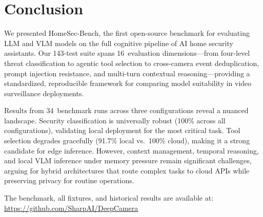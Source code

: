 \documentclass[conference]{IEEEtran}
\begin{document}
\section{Conclusion}

We presented HomeSec-Bench, the first open-source benchmark for evaluating
LLM and VLM models on the full cognitive pipeline of AI home security
assistants. Our 143-test suite spans 16~evaluation dimensions---from
four-level threat classification to agentic tool selection to cross-camera
event deduplication, prompt injection resistance, and multi-turn contextual
reasoning---providing a standardized, reproducible framework for
comparing model suitability in video surveillance deployments.

Results from 34~benchmark runs across three configurations reveal a
nuanced landscape. Security classification is universally robust (100\%
across all configurations), validating local deployment for the most
critical task. Tool selection degrades gracefully (91.7\% local vs.\
100\% cloud), making it a strong candidate for edge inference. However,
context management, temporal reasoning, and local VLM inference under
memory pressure remain significant challenges, arguing for hybrid
architectures that route complex tasks to cloud APIs while preserving
privacy for routine operations.

The benchmark, all fixtures, and historical results are available at:
\url{https://github.com/SharpAI/DeepCamera}

\balance

\end{document}
